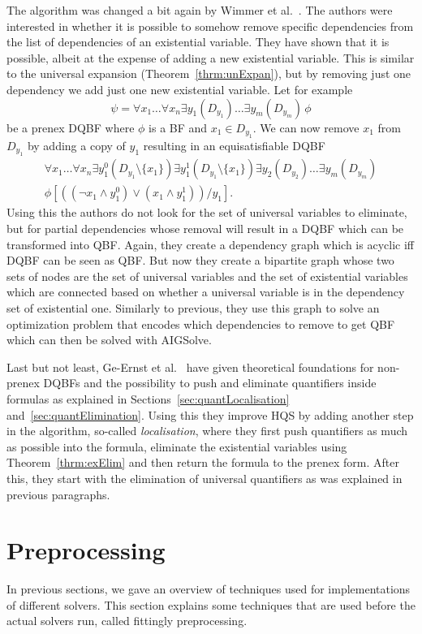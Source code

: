 \documentclass[
  digital, %
  color,
  twoside, %
  table,   %
  nolof,     %
  nolot,     %
]{fithesis3}
\theoremstyle{definition}
\theoremstyle{remark}
\newcommand{\itholds}{\,}
\begin{document}
The algorithm was changed a bit again by Wimmer et al.~\cite{HQSdependencyElimination}. The authors were interested in whether it is possible to somehow remove specific dependencies from the list of dependencies of an existential variable. They have shown that it is possible, albeit at the expense of adding a new existential variable. This is similar to the universal expansion (Theorem~\ref{thrm:unExpan}), but by removing just one dependency we add just one new existential variable. Let for example
\[\psi = \forall x_1 \dots \forall x_n \exists y_1(D_{y_1}) \dots \exists y_m(D_{y_m}) \itholds \phi\]
be a prenex DQBF where $\phi$ is a BF and $x_1 \in D_{y_1}$. We can now remove $x_1$ from $D_{y_1}$ by adding a copy of $y_1$ resulting in an equisatisfiable DQBF
\begin{multline*}
\forall x_1 \dots \forall x_n \exists y_1^0(D_{y_1} \setminus \{x_1\}) \exists y_1^1(D_{y_1} \setminus \{x_1\}) \exists y_2(D_{y_2})\dots \exists y_m(D_{y_m}) \\
\phi\left[((\neg x_1 \land y_1^0) \lor (x_1 \land y_1^1))/y_1\right].
\end{multline*}
Using this the authors do not look for the set of universal variables to eliminate, but for partial dependencies whose removal will result in a DQBF which can be transformed into QBF. Again, they create a dependency graph which is acyclic iff DQBF can be seen as QBF. But now they create a bipartite graph whose two sets of nodes are the set of universal variables and the set of existential variables which are connected based on whether a universal variable is in the dependency set of existential one. Similarly to previous, they use this graph to solve an optimization problem that encodes which dependencies to remove to get QBF which can then be solved with AIGSolve.

Last but not least, Ge-Ernst et al.~\cite{HQSquantifierLocalisation} have given theoretical foundations for non-prenex DQBFs and the possibility to push and eliminate quantifiers inside formulas as explained in Sections~\ref{sec:quantLocalisation} and~\ref{sec:quantElimination}. Using this they improve HQS by adding another step in the algorithm, so-called \emph{localisation}, where they first push quantifiers as much as possible into the formula, eliminate the existential variables using Theorem~\ref{thrm:exElim} and then return the formula to the prenex form. After this, they start with the elimination of universal quantifiers as was explained in previous paragraphs.

\section{Preprocessing}
\label{sec:preprocessing}
In previous sections, we gave an overview of techniques used for implementations of different solvers. This section explains some techniques that are used before the actual solvers run, called fittingly preprocessing.
\end{document}
